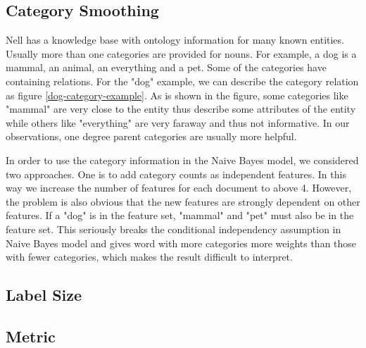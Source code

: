 \subsection{Category Smoothing}

Nell has a knowledge base with ontology information for many known entities. Usually more than one categories are provided for nouns. For example, a dog is a mammal, an animal, an everything and a pet. Some of the categories have containing relations. For the "dog" example, we can describe the category relation as figure \ref{dog-category-example}. As is shown in the figure, some categories like "mammal" are very close to the entity thus describe some attributes of the entity while others like "everything" are very faraway and thus not informative. In our observations, one degree parent categories are usually more helpful.


In order to use the category information in the Naive Bayes model, we considered two approaches. One is to add category counts as independent features. In this way we increase the number of features for each document to above 4. However, the problem is also obvious that the new features are strongly dependent on other features. If a "dog" is in the feature set, "mammal" and "pet" must also be in the feature set. This seriously breaks the conditional independency assumption in Naive Bayes model and gives word with more categories more weights than those with fewer categories, which makes the result difficult to interpret.


\subsection{Label Size}



\subsection{Metric}
